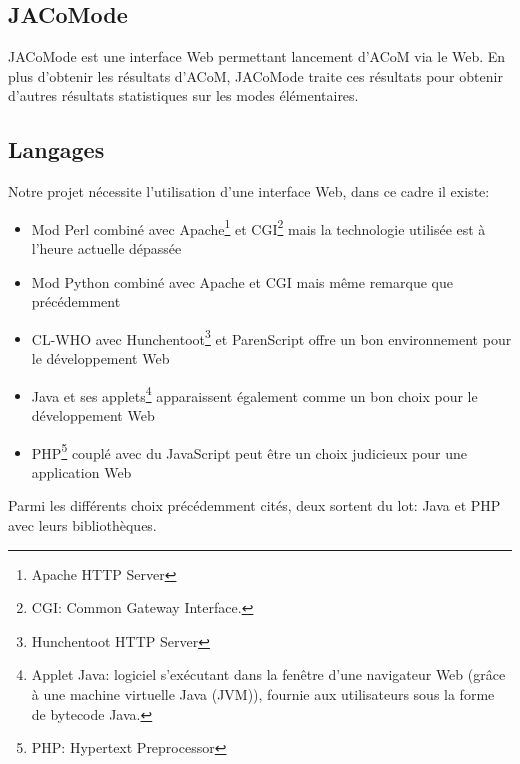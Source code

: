 \subsection{JACoMode}
JACoMode est une interface Web permettant lancement d'ACoM via le Web. En plus d'obtenir les résultats d'ACoM, JACoMode traite ces résultats pour obtenir d'autres résultats statistiques sur les modes élémentaires.

\subsection{Langages}
Notre projet nécessite l'utilisation d'une interface Web, dans ce cadre il existe:
\begin{itemize}
\item Mod Perl combiné avec Apache\footnote{Apache HTTP Server} et CGI\footnote{CGI: Common Gateway Interface.} mais la technologie utilisée est à l'heure actuelle dépassée
\item Mod Python combiné avec Apache et CGI mais même remarque que précédemment
\item CL-WHO avec Hunchentoot\footnote{Hunchentoot HTTP Server} et ParenScript offre un bon environnement pour le développement Web
\item Java et ses applets\footnote{Applet Java: logiciel s'exécutant dans la fenêtre d'une navigateur Web (grâce à une machine virtuelle Java (JVM)), fournie aux utilisateurs sous la forme de bytecode Java.} apparaissent également comme un bon choix pour le développement Web
\item PHP\footnote{PHP: Hypertext Preprocessor} couplé avec du JavaScript peut être un choix judicieux pour une application Web
\end{itemize}

Parmi les différents choix précédemment cités, deux sortent du lot: Java et PHP avec leurs bibliothèques.